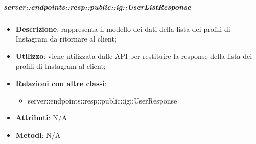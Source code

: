     \subparagraph{server::endpoints::resp::public::ig::UserListResponse} %
    \label{subp:bdsm_app_server_endpoints_resp_public_ig_userlistresponse}
    \begin{itemize}
      \item \textbf{Descrizione}: rappresenta il modello dei dati della lista dei profili di Instagram da ritornare al client;
      \item \textbf{Utilizzo}: viene utilizzata dalle API per restituire la response della lista dei profili di Instagram al client;
      \item \textbf{Relazioni con altre classi}:
        \begin{itemize}
          \item server::endpoints::resp::public::ig::UserResponse
        \end{itemize}
    \item \textbf{Attributi}: N/A
    \item \textbf{Metodi}: N/A
      \end{itemize}

